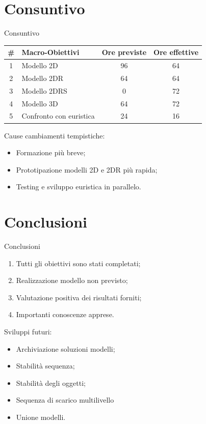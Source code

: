 \documentclass{beamer}
\begin{document}
\section{Consuntivo}
\begin{frame}{Consuntivo}
	\begin{center}
		\begin{tabular}{|c |l|c|c|}
			\hline
			\textbf{\#} & \textbf{Macro-Obiettivi} & \textbf{Ore previste} & \textbf{Ore effettive} \\\hline
			1            & Modello 2D               & 96                    & 64                     \\\hline
			2            & Modello 2DR              & 64                    & 64                     \\\hline
			3            & Modello 2DRS             & 0                     & 72                     \\\hline
			4            & Modello 3D               & 64                    & 72                     \\\hline
			5            & Confronto con euristica  & 24                    & 16                     \\\hline
		\end{tabular}
	\end{center}
	Cause cambiamenti tempistiche:
	\begin{itemize}
		\item Formazione pi\`u breve;
		\item Prototipazione modelli 2D e 2DR più rapida;
		\item Testing e sviluppo euristica in parallelo.
	\end{itemize}
\end{frame}
\section{Conclusioni}
\begin{frame}{Conclusioni}
	\begin{enumerate}
		\item Tutti gli obiettivi sono stati completati;
		\item Realizzazione modello non previsto;
		\item Valutazione positiva dei risultati forniti;
		\item Importanti conoscenze apprese.
	\end{enumerate}
	
	\vspace{.5em}
	Sviluppi futuri:
	\begin{itemize}
		\item Archiviazione soluzioni modelli;
		\item Stabilit\`a sequenza;
		\item Stabilit\`a degli oggetti;
		\item Sequenza di scarico multilivello
		\item Unione modelli.
	\end{itemize}
\end{frame}
\end{document}
